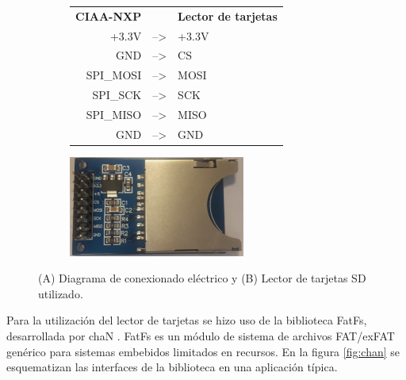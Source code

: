 \vspace{20px}

\renewcommand{\thesubfigure}{\alph{subfigure}}

\begin{figure}[h]
	\centering
	\begin{subfigure}{.4\textwidth}
		\centering
		\begin{tabular}{rll}
			\textbf{CIAA-NXP }&	& \textbf{Lector de tarjetas}\\
			+3.3V     & --\textgreater{} & +3.3V   \\
			GND       & --\textgreater{} & CS  \\
			SPI\_MOSI & --\textgreater{} & MOSI  \\
			SPI\_SCK  & --\textgreater{} & SCK \\
			SPI\_MISO & --\textgreater{} & MISO  \\
			GND       & --\textgreater{} & GND  \\
		\end{tabular}
		\caption{}
  		\label{fig:lector_conexionado}
	\end{subfigure}%
	\begin{subfigure}{.6\textwidth}
	\hspace{15px}
		\centering
		\includegraphics[height=3.3cm]{./Figures/sdCardReader.jpg}
		\caption{ }
		\label{fig:lector_hardware}
	\end{subfigure}
	\caption{(A) Diagrama de conexionado eléctrico y (B) Lector de tarjetas SD utilizado.}
	\label{fig:lector_sdCard}
\end{figure}

\vspace{10px}

Para la utilización del lector de tarjetas se hizo uso de la biblioteca FatFs, desarrollada por chaN \citep{fatFS}. FatFs es un módulo de sistema de archivos FAT/exFAT genérico para sistemas embebidos limitados en recursos. En la figura \ref{fig:chan} se esquematizan las interfaces de la biblioteca en una aplicación típica.

